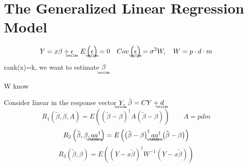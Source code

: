 \documentclass{article}
\begin{document}
\part{The Generalized Linear Regression Model}

\begin{equation*}
Y=x\beta +%
\underaccent{\wtilde}{\epsilon}%
\quad E\left( 
\underaccent{\wtilde}{\epsilon}%
\right) =0\quad Cov\left( 
\underaccent{\wtilde}{\epsilon}%
\right) =\sigma ^{2}W,\quad W=p\cdot d\cdot m
\end{equation*}%
rank(x)=k, we want to estimate $%
\underaccent{\wtilde}{\beta}%
$

W know

Consider linear in the response vector $%
\underaccent{\wtilde}{Y}%
,$ $\hat{\beta}=CY+%
\underaccent{\wtilde}{d}%
$%
\begin{equation*}
R_{1}\left( \tilde{\beta},\beta ,A\right) =E\left( \left( \tilde{\beta}%
-\beta \right) ^{\dagger }A\left( \tilde{\beta}-\beta \right) \right) \qquad
A=pdm
\end{equation*}%
\begin{equation*}
R_{2}\left( \tilde{\beta},\beta ,%
\underaccent{\wtilde}{a}%
\underaccent{\wtilde}{a}%
^{\dagger }\right) =E\left( \left( \tilde{\beta}-\beta \right) ^{\dagger }%
\underaccent{\wtilde}{a}%
\underaccent{\wtilde}{a}%
^{\dagger }\left( \tilde{\beta}-\beta \right) \right)
\end{equation*}%
\begin{equation*}
R_{3}\left( \tilde{\beta},\beta \right) =E\left( \left( Y-x\tilde{\beta}%
\right) ^{\dagger }W^{-1}\left( Y-x\tilde{\beta}\right) \right)
\end{equation*}
\end{document}
